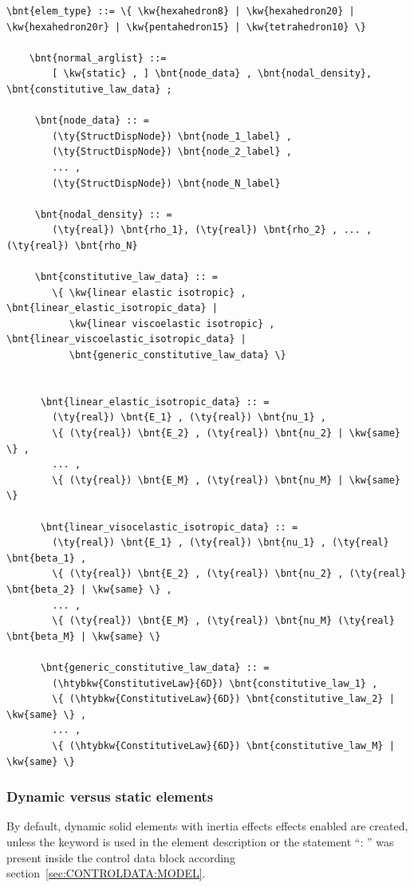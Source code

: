\begin{Verbatim}[commandchars=\\\{\}]
    \bnt{elem_type} ::= \{ \kw{hexahedron8} | \kw{hexahedron20} | \kw{hexahedron20r} | \kw{pentahedron15} | \kw{tetrahedron10} \}

    \bnt{normal_arglist} ::=
        [ \kw{static} , ] \bnt{node_data} , \bnt{nodal_density}, \bnt{constitutive_law_data} ;

     \bnt{node_data} :: =
        (\ty{StructDispNode}) \bnt{node_1_label} ,
        (\ty{StructDispNode}) \bnt{node_2_label} ,
        ... ,
        (\ty{StructDispNode}) \bnt{node_N_label}

     \bnt{nodal_density} :: =
        (\ty{real}) \bnt{rho_1}, (\ty{real}) \bnt{rho_2} , ... , (\ty{real}) \bnt{rho_N}

     \bnt{constitutive_law_data} :: =
        \{ \kw{linear elastic isotropic} , \bnt{linear_elastic_isotropic_data} |
           \kw{linear viscoelastic isotropic} , \bnt{linear_viscoelastic_isotropic_data} |
           \bnt{generic_constitutive_law_data} \}


      \bnt{linear_elastic_isotropic_data} :: =
        (\ty{real}) \bnt{E_1} , (\ty{real}) \bnt{nu_1} ,
        \{ (\ty{real}) \bnt{E_2} , (\ty{real}) \bnt{nu_2} | \kw{same} \} ,
        ... ,
        \{ (\ty{real}) \bnt{E_M} , (\ty{real}) \bnt{nu_M} | \kw{same} \}

      \bnt{linear_visocelastic_isotropic_data} :: =
        (\ty{real}) \bnt{E_1} , (\ty{real}) \bnt{nu_1} , (\ty{real} \bnt{beta_1} ,
        \{ (\ty{real}) \bnt{E_2} , (\ty{real}) \bnt{nu_2} , (\ty{real} \bnt{beta_2} | \kw{same} \} ,
        ... ,
        \{ (\ty{real}) \bnt{E_M} , (\ty{real}) \bnt{nu_M} (\ty{real} \bnt{beta_M} | \kw{same} \}

      \bnt{generic_constitutive_law_data} :: =
        (\htybkw{ConstitutiveLaw}{6D}) \bnt{constitutive_law_1} ,
        \{ (\htybkw{ConstitutiveLaw}{6D}) \bnt{constitutive_law_2} | \kw{same} \} ,
        ... ,
        \{ (\htybkw{ConstitutiveLaw}{6D}) \bnt{constitutive_law_M} | \kw{same} \}
\end{Verbatim}

\subsubsection{Dynamic versus static elements}
By default, dynamic solid elements with inertia effects effects enabled are created,
unless the keyword  is used in the element description
or the statement ``: '' was present inside the control data block according section~\ref{sec:CONTROLDATA:MODEL}.
